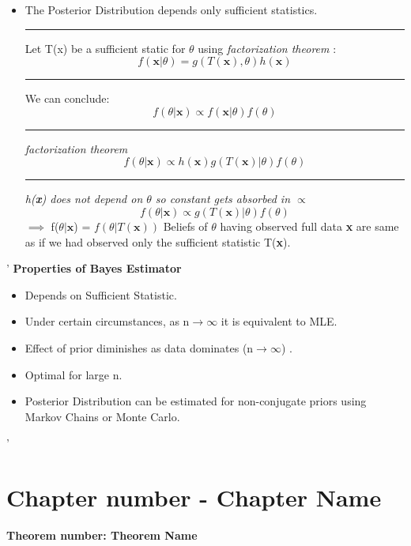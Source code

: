 \documentclass[]{article}
\begin{document}

\newpage
\begin{itemize}
	\item The Posterior Distribution depends only sufficient statistics. 
	\newline
	\newline \Large\rule{1.3cm}{0pt} Let T(x) be a sufficient static for $\theta$ using \textit{factorization theorem} :
	\[  f(\textbf{x}| \theta  )  =  g(T(\textbf{x}), \theta) h(\textbf{x}) \]
	\newline \Large\rule{1.3cm}{0pt}  We can conclude: 
	\[  f(\theta | \textbf{x})  \propto f(\textbf{x} | \theta) f( \theta)  \]
	\Large\rule{1.3cm}{0pt}\textit{factorization theorem} 
	\[  f(\theta | \textbf{x})  \propto h(\textbf{x}) g(T(\textbf{x})| \theta)  f( \theta)  \]
	\Large\rule{1.3cm}{0pt}\textit{h(\textbf{x}) does not depend on $\theta$ so constant gets absorbed in $\propto$}  
	\[  f(\theta | \textbf{x})  \propto g(T(\textbf{x})| \theta)  f( \theta)  \]
	$\implies$ f($\theta | \textbf{x} $)  = $f(\theta | T(\textbf{x}))$
	\newline\newline Beliefs of $\theta$ having observed full data \textbf{x} are same as if we had observed only the sufficient statistic T(\textbf{x}).
\end{itemize}'
\newline \Large\textbf{Properties of Bayes Estimator}
\begin{itemize}
	\item Depends on Sufficient Statistic.
	\item Under certain circumstances, as n$\to\infty$ it is equivalent to MLE.
	\item Effect of prior diminishes as data dominates (n$\to\infty$) .
	\item Optimal for large n.
	\item Posterior Distribution can be estimated for non-conjugate priors using Markov Chains or Monte Carlo.
\end{itemize}'

\newpage
\section{Chapter number - Chapter Name}
\Large\textbf{Theorem number: Theorem Name}
\end{document}
